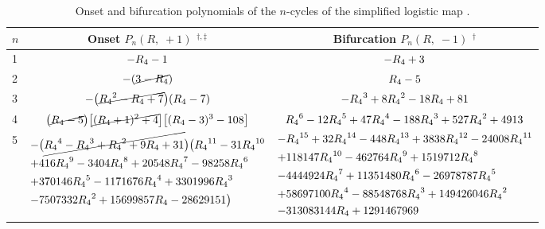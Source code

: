 \documentclass[twocolumn]{revtex4-1}
\begin{document}
\begin{table*}[t]\footnotesize
  \caption{
  Onset and bifurcation polynomials %
  of the $n$-cycles of the simplified logistic map .}
\begin{center}
\begin{tabular}{lcc}
\hline
  $n$
& Onset $P_n(R, \; +1)$ $^{\dagger, \ddagger}$
& Bifurcation $P_n(R, \; -1)$ $^\dagger$
\\
\hline
1
&
$-{R_4}-1$
&
$-{R_4}+3$
\\
2
&
$-(\cancel{3-{R_4}})$
&
${R_4}-5$
\\
3
&
$\begin{aligned}
-
\big( \cancel{
  {R_4}^2-{R_4}+7
}\big)
  ({R_4}-7)
\end{aligned}$
&
$\begin{aligned}
 - {R_4}^3 + 8{R_4}^2 - 18{R_4} + 81
\end{aligned}$
\\
4
&
$\begin{aligned}
\big( \cancel{
  {R_4} - 5
} \big)
\big[ \cancel{
  ({R_4}+1)^2 + 4
} \big]
\big[
  ({R_4}-3)^3 - 108
\big]
\end{aligned}$

&

$
{R_4}^6-12 {R_4}^5+47 {R_4}^4-188 {R_4}^3+527 {R_4}^2+4913
$
\\
5

&

\begin{minipage}{.48\linewidth}
$\begin{aligned}
-
&\big( \cancel{
{R_4}^4-{R_4}^3+{R_4}^2+9 {R_4}+31
} \big)
\big(
{R_4}^{11}-31 {R_4}^{10} \\
+&416 {R_4}^9 -3404 {R_4}^8 +20548 {R_4}^7-98258 {R_4}^6 \\
+&370146 {R_4}^5 -1171676 {R_4}^4 +3301996 {R_4}^3\\
-&7507332 {R_4}^2+15699857 {R_4}-28629151
\big)
\end{aligned}$
\end{minipage}

&

\begin{minipage}{.49\linewidth}
\vspace{1mm}
$\begin{aligned}
-&{R_4}^{15}+32 {R_4}^{14}-448 {R_4}^{13}+3838 {R_4}^{12}-24008 {R_4}^{11}\\
+&118147 {R_4}^{10} -462764 {R_4}^9+1519712 {R_4}^8\\
-&4444924 {R_4}^7 +11351480 {R_4}^6 -26978787 {R_4}^5\\
+&58697100 {R_4}^4 -88548768 {R_4}^3+149426046 {R_4}^2\\
-&313083144 {R_4} +1291467969
\end{aligned}$
\vspace{1mm}
\end{minipage}


\end{tabular}
\end{center}
\end{table*}
\end{document}
